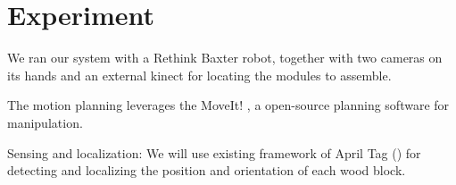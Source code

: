 \section{Experiment}

We ran our system with a Rethink Baxter robot, together with two cameras on its hands and an external kinect for locating the modules to assemble. 

The motion planning leverages the MoveIt! \cite{moveit}, a open-source planning software for manipulation. 


Sensing and localization: We will use existing framework of April Tag (\cite{Olson11}) for detecting and localizing the position and orientation of each wood block.

